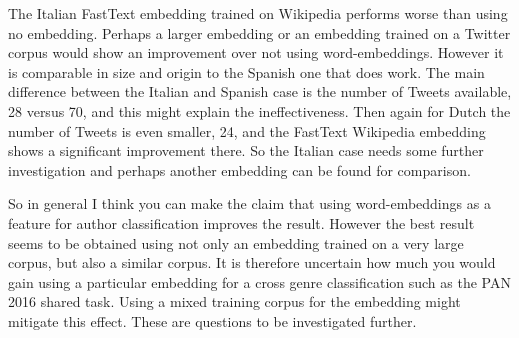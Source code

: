 \documentclass[11pt]{article}
\begin{document}
The Italian FastText embedding trained on Wikipedia performs worse than using no embedding. Perhaps a larger embedding or an embedding trained on a Twitter corpus would show an improvement over not using word-embeddings. However it is comparable in size and origin to the Spanish one that does work. The main difference between the Italian and Spanish case is the number of Tweets available, 28 versus 70, and this might explain the ineffectiveness. Then again for Dutch the number of Tweets is even smaller, 24, and the FastText Wikipedia embedding shows a significant improvement there. So the Italian case needs some further investigation and perhaps another embedding can be found for comparison.

So in general I think you can make the claim that using word-embeddings as a feature for author classification improves the result. However the best result seems to be obtained using not only an embedding trained on a very large corpus, but also a similar corpus. It is therefore uncertain how much you would gain using a particular embedding for a cross genre classification such as the PAN 2016 shared task. Using a mixed training corpus for the embedding might mitigate this effect. These are questions to be investigated further.



\end{document}
